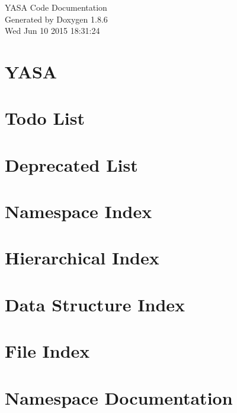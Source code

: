 \documentclass[twoside]{book}
\newcommand{\clearemptydoublepage}{%
  \newpage{\pagestyle{empty}\cleardoublepage}%
}
\begin{document}
\hypersetup{pageanchor=false}
\begin{titlepage}
\vspace*{7cm}
\begin{center}%
{\Large Y\-A\-S\-A Code Documentation }\\
\vspace*{1cm}
{\large Generated by Doxygen 1.8.6}\\
\vspace*{0.5cm}
{\small Wed Jun 10 2015 18:31:24}\\
\end{center}
\end{titlepage}
\clearemptydoublepage
\tableofcontents
\clearemptydoublepage
{}
\hypersetup{pageanchor=true}

\chapter{Y\-A\-S\-A}
\label{md__r_e_a_d_m_e}
\hypertarget{md__r_e_a_d_m_e}{}

\chapter{Todo List}
\label{todo}
\hypertarget{todo}{}

\chapter{Deprecated List}
\label{deprecated}
\hypertarget{deprecated}{}

\chapter{Namespace Index}

\chapter{Hierarchical Index}

\chapter{Data Structure Index}

\chapter{File Index}

\chapter{Namespace Documentation}







\end{document}
